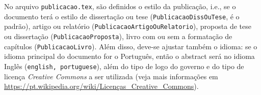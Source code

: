 No arquivo {\tt publicacao.tex}, são definidos o estilo da publicação, i.e., se o documento terá o estilo de dissertação ou tese ({\tt PublicacaoDissOuTese}, é o padrão), artigo ou relatório ({\tt PublicacaoArtigoOuRelatorio}), proposta de tese ou dissertação ({\tt PublicacaoProposta}), livro com ou sem a formatação de capítulos ({\tt PublicacaoLivro}). Além disso, deve-se ajustar também o idioma: se o idioma principal do documento for o Português, então o abstract será no idioma Inglês ({\tt english, portuguese}), além do tipo de logo do governo e do tipo de licença \textit{Creative Commons} a ser utilizada (veja mais informações em \url{https://pt.wikipedia.org/wiki/Licenças_Creative_Commons}).

